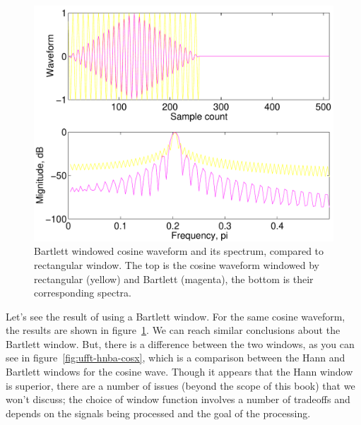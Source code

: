 \begin{figure}
\centerline{\includegraphics[height=0.35\textheight]{ch-fft/ufft_bartlrect_cosx512_256}}
\caption[Bartlett windowed cosine waveform and its spectrum]{Bartlett
windowed cosine waveform and its spectrum, compared to rectangular
window. The top is the cosine waveform windowed by rectangular
(yellow) and Bartlett (magenta), the bottom is their corresponding
spectra.\label{fig:ufft-bart-cosx}}
\end{figure}

Let's see the result of using a Bartlett window. For the same cosine
waveform, the results are shown in figure~\ref{fig:ufft-bart-cosx}.
We can reach similar conclusions about the Bartlett window. But, there
is a difference between the two windows, as you can see in
figure~\ref{fig:ufft-hnba-cosx}, which is a comparison between the
Hann and Bartlett windows for the cosine wave. Though it appears that
the Hann window is superior, there are a number of issues (beyond the
scope of this book) that we won't discuss; the choice of window
function involves a number of tradeoffs and depends on the signals
being processed and the goal of the processing.


